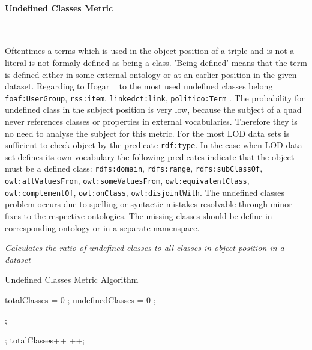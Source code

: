 \paragraph{Undefined Classes Metric} ~\\ 
\label{par:undefClass}

Oftentimes a terms which is used in the object position of a triple and is not a literal is not formaly defined as being a class.
'Being defined' means that the term is defined either in some external ontology or at an earlier position in the given dataset. 
Regarding to Hogar ~\cite{hogan2010} to the most used undefined classes belong \texttt{foaf:UserGroup}, \texttt{rss:item}, \texttt{linkedct:link}, \texttt{politico:Term} .
The probability for undefined class in the subject position is very low, because the subject of a quad never references classes or properties in external vocabularies.
Therefore they is no need to analyse the subject for this metric.
For the most LOD data sets is sufficient to check object by the predicate \texttt{rdf:type}. 
In the case when LOD data set defines its own vocabulary the following predicates indicate that the object must be a defined class:  \texttt{rdfs:domain}, \texttt{rdfs:range}, \texttt{rdfs:subClassOf}, \texttt{owl:allValuesFrom}, \texttt{owl:someValuesFrom}, \texttt{owl:equivalentClass}, \texttt{owl:complementOf}, \texttt{owl:onClass}, \texttt{owl:disjointWith}.
The undefined classes problem occurs due to spelling or syntactic mistakes resolvable through minor fixes to the respective ontologies.
The missing classes should be define in corresponding ontology or in a separate namenspace.


\begin{mdframed}[style=metricdefinition]
\emph{Calculates the ratio of undefined classes to all classes in object position in a dataset}
\end{mdframed}


\begin{algorithm}
\caption{Undefined Classes Metric Algorithm}\label{lst:undefCl}
\begin{algorithmic}[1]
\State totalClasses = 0 ;
\State undefinedClasses = 0 ;
\EndProcedure

 ; 

; \EndIf
\EndIf
\State totalClasses++ ++;
\EndProcedure
\end{algorithmic}
\end{algorithm}

